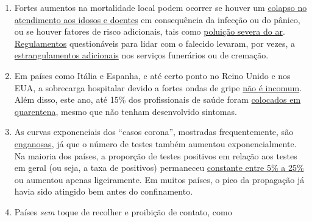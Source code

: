 \begin{enumerate}
{  morreram de Covid-19}, já estavam
  \href{https://sports.yahoo.com/spanish-football-coach-francisco-garcia-163153573.html}{gravemente
  doentes} (por exemplo, de leucemia não-diagnosticada), ou na verdade
  tinham
  \href{https://www.n-tv.de/panorama/Neunjaehrige-Corona-Tote-war-109-Jahre-alt-article21753784.html}{109
  anos de idade em vez de 9 anos}. O alegado aumento da doença de
  Kawasaki em crianças também revelou-se
  \href{https://www.societi.org.uk/kawasaki-disease-covid-19/responding-to-press-coverage-28-april-2020/}{falso}.
\item
  Fortes aumentos na mortalidade local podem ocorrer se houver um
  \href{https://swprs.org/covid-19-a-report-from-italy/}{colapso no
  atendimento aos idosos e doentes} em consequência da infecção ou do
  pânico, ou se houver fatores de risco adicionais, tais como
  \href{https://www.theguardian.com/environment/2020/apr/20/air-pollution-may-be-key-contributor-to-covid-19-deaths-study}{poluição
  severa do ar}.
  \href{https://www.ecdc.europa.eu/sites/default/files/documents/COVID-19-safe-handling-of-bodies-or-persons-dying-from-COVID19.pdf}{Regulamentos}
  questionáveis para lidar com o falecido levaram, por vezes, a
  \href{https://www.globalresearch.ca/truth-behind-refrigerated-morgue-truck-stories/5711475}{estrangulamentos
  adicionais} nos serviços funerários ou de cremação.
\item
  Em países como Itália e Espanha, e até certo ponto no Reino Unido e
  nos EUA, a sobrecarga hospitalar devido a fortes ondas de gripe
  \href{https://off-guardian.org/2020/04/02/coronavirus-fact-check-1-flu-doesnt-overwhelm-our-hospitals/}{não
  é incomum}. Além disso, este ano, até 15\% dos profissionais de saúde
  foram
  \href{https://www.nytimes.com/2020/03/24/world/europe/coronavirus-europe-covid-19.html}{colocados
  em quarentena}, mesmo que não tenham desenvolvido sintomas.
\item
  As curvas exponenciais dos ``casos corona'', mostradas frequentemente,
  são
  \href{https://fivethirtyeight.com/features/coronavirus-case-counts-are-meaningless/}{enganosas},
  já que o número de testes também aumentou exponencialmente. Na maioria
  dos países, a proporção de testes positivos em relação aos testes em
  geral (ou seja, a taxa de positivos) permaneceu
  \href{https://swprs.org/rate-of-positive-covid19-tests/}{constante
  entre 5\% a 25\%} ou aumentou apenas ligeiramente. Em muitos países, o
  pico da propagação já havia sido atingido bem antes do confinamento.
\item
  Países \emph{sem} toque de recolher e proibição de contato, como

\end{enumerate}
